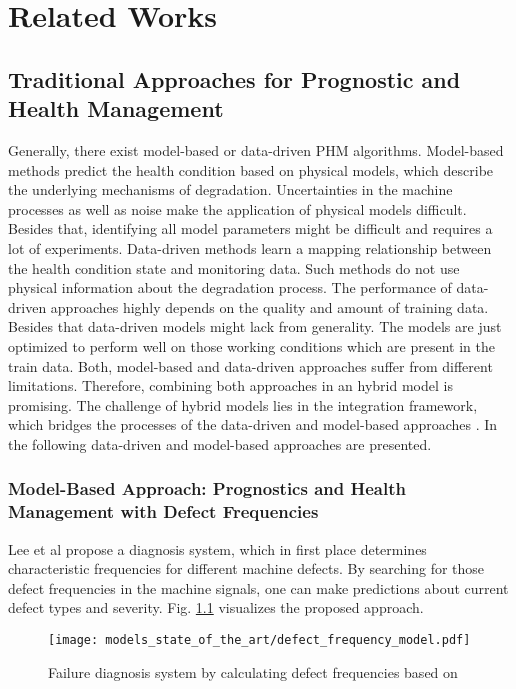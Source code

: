 
\chapter{Related Works}\label{chapter:related_works}


\section{Traditional Approaches for Prognostic and Health Management}

Generally, there exist model-based or data-driven PHM algorithms. Model-based methods predict the health condition based on physical models, which describe the underlying mechanisms of degradation. Uncertainties in the machine processes as well as noise make the application of physical models difficult. Besides that, identifying all model parameters might be difficult and requires a lot of experiments. Data-driven methods learn a mapping relationship between the health condition state and monitoring data. Such methods do not use physical information about the degradation process. The performance of data-driven approaches highly depends on the quality and amount of training data. Besides that data-driven models might lack from generality. The models are just optimized to perform well on those working conditions which are present in the train data. Both, model-based and data-driven approaches suffer from different limitations. Therefore, combining both approaches in an hybrid model is promising. The challenge of hybrid models lies in the integration framework, which bridges the processes of the data-driven and model-based approaches  \cite{DENG2020}. In the following data-driven and model-based approaches are presented. 

\subsection{Model-Based Approach: Prognostics and Health Management with Defect Frequencies}
Lee et al \cite{Lee2015} propose a diagnosis system, which in first place determines characteristic frequencies for different machine defects. By searching for those defect frequencies in the machine signals, one can make predictions about current defect types and severity. Fig. \ref{fig:defect_frequency_model} visualizes the proposed approach.

\begin{figure}[H]
  \centering
  \texttt{[image: models\_state\_of\_the\_art/defect\_frequency\_model.pdf]}
  \caption{Failure diagnosis system by calculating defect frequencies based on \cite{Lee2015}}
  \label{fig:defect_frequency_model}
\end{figure}

